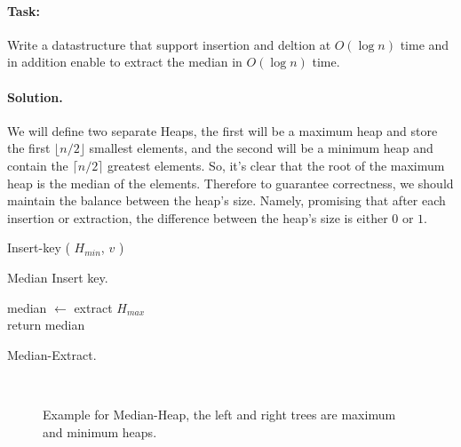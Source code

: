 \paragraph{Task:}Write a datastructure that support insertion and deltion at $O\left( \log n \right) $ time and in addition enable to extract the median in $O\left( \log n  \right)$ time. 

\paragraph{Solution.} We will define two separate Heaps, the first will be a maximum heap and store the first $ \lfloor n/2 \rfloor $ smallest elements, and the second will be a minimum heap and contain the $ \lceil n/2 \rceil$ greatest elements. So, it's clear that the root of the maximum heap is the median of the elements. Therefore to guarantee correctness, we should maintain the balance between the heap's size. Namely, promising that after each insertion or extraction, the difference between the heap's size is either $0$ or $1$.

\begin{algorithm}
 {
	 {
       Insert-key ( $H_{min}$, $v$ )
    }
}
\caption{Median Insert key.}
\end{algorithm}

\begin{algorithm}
median $\leftarrow$ extract $H_{max}$ \\   
return median 
\caption{Median-Extract.}
\end{algorithm}

\begin{figure}[h]
  \centering
  \begin{subfigure}[b]{0.9\textwidth}
	
  \end{subfigure}
  \\ 
\begin{subfigure}[b]{0.9\textwidth}
	
  \end{subfigure}
  \caption{ Example for Median-Heap, the left and right trees are maximum and minimum heaps.  }
\end{figure}


